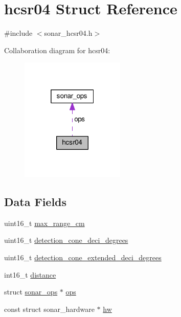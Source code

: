 \hypertarget{structhcsr04}{\section{hcsr04 Struct Reference}
\label{structhcsr04}
}


{\ttfamily \#include $<$sonar\+\_\+hcsr04.\+h$>$}



Collaboration diagram for hcsr04\+:\nopagebreak
\begin{figure}[H]
\begin{center}
\leavevmode
\includegraphics[width=140pt]{structhcsr04__coll__graph}
\end{center}
\end{figure}
\subsection*{Data Fields}
\begin{DoxyCompactItemize}
\item 
uint16\+\_\+t \hyperlink{structhcsr04_a1ffe6b9a0aef53bffed96e837e34d9ef}{max\+\_\+range\+\_\+cm}
\item 
uint16\+\_\+t \hyperlink{structhcsr04_a3380a31d3ef464dd55cb0676f94fc874}{detection\+\_\+cone\+\_\+deci\+\_\+degrees}
\item 
uint16\+\_\+t \hyperlink{structhcsr04_ab3533762a19351d70c91875d67386332}{detection\+\_\+cone\+\_\+extended\+\_\+deci\+\_\+degrees}
\item 
int16\+\_\+t \hyperlink{structhcsr04_aa56e95ecd943eac4fe42eda1e030f14f}{distance}
\item 
struct \hyperlink{structsonar__ops}{sonar\+\_\+ops} $\ast$ \hyperlink{structhcsr04_ad8097a58ad611b2a4830226e5afd8ac2}{ops}
\item 
const struct sonar\+\_\+hardware $\ast$ \hyperlink{structhcsr04_aaf48111fe6c479ed6f24b435edd397a0}{hw}
\end{DoxyCompactItemize}


